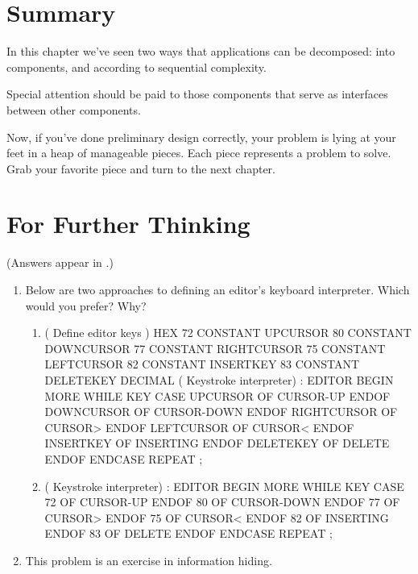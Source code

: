 \section{Summary}

In this chapter we've seen two ways that applications can be
decomposed: into components, and according to sequential complexity.

Special attention should be paid to those components that serve as
interfaces between other components.

Now, if you've done preliminary design correctly, your problem is
lying at your feet in a heap of manageable pieces. Each piece represents a
problem to solve. Grab your favorite piece and turn to the next chapter.

\section{For Further Thinking}

(Answers appear in .)

\begin{enumerate}
\item Below are two approaches to defining an editor's keyboard interpreter.
Which would you prefer? Why?

\begin{enumerate}
\item \begin{Code}
( Define editor keys )
HEX
72 CONSTANT UPCURSOR
80 CONSTANT DOWNCURSOR
77 CONSTANT RIGHTCURSOR
75 CONSTANT LEFTCURSOR
82 CONSTANT INSERTKEY
83 CONSTANT DELETEKEY
DECIMAL
( Keystroke interpreter)
: EDITOR
   BEGIN  MORE WHILE  KEY   CASE
      UPCURSOR     OF  CURSOR-UP     ENDOF
      DOWNCURSOR   OF  CURSOR-DOWN   ENDOF
      RIGHTCURSOR  OF  CURSOR>       ENDOF
      LEFTCURSOR   OF  CURSOR<       ENDOF
      INSERTKEY    OF  INSERTING     ENDOF
      DELETEKEY    OF  DELETE        ENDOF
   ENDCASE  REPEAT ;
\end{Code}

\item \begin{Code}
( Keystroke interpreter)
: EDITOR
   BEGIN  MORE WHILE  KEY   CASE
      72 OF  CURSOR-UP     ENDOF
      80 OF  CURSOR-DOWN   ENDOF
      77 OF  CURSOR>       ENDOF
      75 OF  CURSOR<       ENDOF
      82 OF  INSERTING     ENDOF
      83 OF  DELETE        ENDOF
   ENDCASE  REPEAT ;
\end{Code}
\end{enumerate}

\item This problem is an exercise in information hiding.
\end{enumerate}

